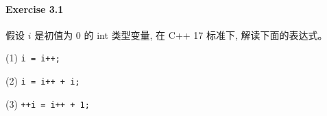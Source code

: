 \documentclass{article}
\begin{document}
	\paragraph*{Exercise 3.1} 假设 $i$ 是初值为 0 的 int 类型变量, 在 C++ 17 标准下, 解读下面的表达式。
	
	(1) \verb|i = i++; |
	
	(2) \verb|i = i++ + i;|
	
	(3) \verb|++i = i++ + 1;|
		
\end{document}
